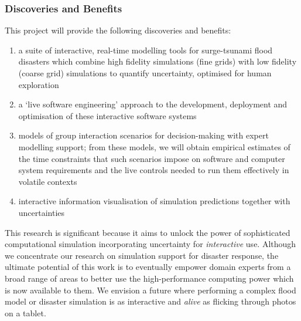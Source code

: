 \newpage
\subsubsection*{Discoveries and Benefits}

This project will provide the following discoveries and benefits:
\begin{enumerate}

\item a suite of interactive, real-time modelling tools for
  surge-tsunami flood disasters which combine high fidelity
  simulations (fine grids) with low fidelity (coarse grid) simulations
  to quantify uncertainty, optimised for human exploration

\item a `live software engineering' approach to the development,
  deployment and optimisation of these interactive software systems

\item models of group interaction scenarios for decision-making with
  expert modelling support; from these models, we will obtain  empirical estimates of
  the time constraints that such scenarios impose on software
  and computer system requirements and the live controls needed to run
  them effectively in volatile contexts

\item interactive information visualisation of simulation predictions
together with uncertainties
 

\end{enumerate}

This research is significant because it aims to unlock the power of
sophisticated computational simulation incorporating  uncertainty 
for \emph{interactive} use.
Although we concentrate our research on simulation support for
disaster response, the ultimate potential of this work is to
eventually empower domain experts from a broad range of areas to
better use the high-performance computing power which is now available
to them. We envision a future where performing a complex flood model
or disaster simulation is as interactive and \emph{alive} as flicking
through photos on a tablet.

